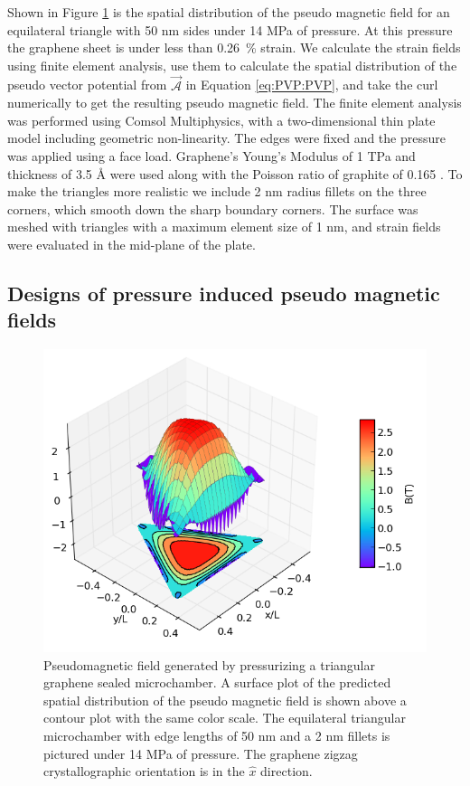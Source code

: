 Shown in Figure \ref{fig:PVP:triangle} is the spatial distribution of the pseudo magnetic field for an equilateral triangle with 50 nm sides under 14 MPa of pressure.
At this pressure the graphene sheet is under less than 0.26~\% strain.
We calculate the strain fields using finite element analysis, use them to calculate the spatial distribution of the pseudo vector potential from $\vec{\mathcal{A}}$ in Equation \ref{eq:PVP:PVP}, and take the curl numerically to get the resulting pseudo magnetic field.
The finite element analysis was performed using Comsol Multiphysics, with a two-dimensional thin plate model including geometric non-linearity.
The edges were fixed and the pressure was applied using a face load.
Graphene's Young's Modulus of 1 TPa and thickness of 3.5 \AA \cite{Lee2008} were used along with the Poisson ratio of graphite of 0.165 \cite{Blakslee1970}.
To make the triangles more realistic we include 2 nm radius fillets on the three corners, which smooth down the sharp boundary corners.
The surface was meshed with triangles with a maximum element size of 1 nm, and strain fields were evaluated in the mid-plane of the plate.

\subsection{Designs of pressure induced pseudo magnetic fields}
\begin{figure}
  \begin{center}
  \includegraphics[scale=.75]{Figs_PVP/Triangle_PMF.png}
  \end{center}
  \caption[Pseudomagnetic field generated by pressurizing a triangular graphene sealed microchamber]{\label{fig:PVP:triangle} Pseudomagnetic field generated by pressurizing a triangular graphene sealed microchamber. A surface plot of the predicted spatial distribution of the pseudo magnetic field is shown above a contour plot with the same color scale. The equilateral triangular microchamber with edge lengths of 50 nm and a 2 nm fillets is pictured under 14 MPa of pressure. The graphene zigzag crystallographic orientation is in the $\hat{x}$ direction.}
\end{figure}

